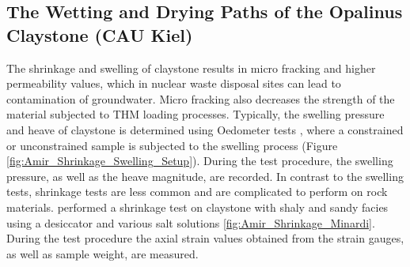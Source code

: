 \subsection{The Wetting and Drying Paths of the Opalinus Claystone (CAU Kiel)}
\label{sec:Shrinkage_Swelling_Exp}

The shrinkage and swelling of claystone results in micro fracking and higher permeability values, which in nuclear waste disposal sites can lead to contamination of groundwater. Micro fracking also decreases the strength of the material subjected to THM  loading processes. Typically, the swelling pressure and heave of claystone is determined using Oedometer tests \cite{Peronetal2009}, where a constrained or unconstrained sample is subjected to the swelling process (Figure \ref{fig:Amir_Shrinkage_Swelling_Setup}). During the test procedure, the swelling pressure, as well as the heave magnitude, are recorded. In contrast to the swelling tests, shrinkage tests are less common and are complicated to perform on rock materials. \cite{Minardietal2016} performed a shrinkage test on claystone with shaly and sandy facies using a desiccator and various salt solutions \ref{fig:Amir_Shrinkage_Minardi}. During the test procedure the axial strain values obtained from the strain gauges, as well as sample weight, are measured.


